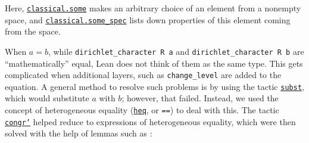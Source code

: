 \documentclass[a4paper,UKenglish,cleveref, autoref, thm-restate,pdfa]{lipics-v2021}
\newcommand{\lean}[1]{\texttt{#1}\xspace} %
\begin{document}
Here, \href{https://leanprover-community.github.io/mathlib_docs/init/classical.html#classical.some}{\lean{classical.some}} 
makes an arbitrary choice of an element from a nonempty space, and \href{https://leanprover-community.github.io/mathlib_docs/init/classical.html#classical.some_spec}{\lean{classical.some\_spec}} 
lists down properties of this element coming from the space. 

When $a = b$, while \lean{dirichlet\_character R a} and \lean{dirichlet\_character R b} are ``mathematically'' equal, Lean does 
not think of them as the same type. This gets complicated when additional layers, such as \lean{change\_level} are added to the equation. 
A general method to resolve such problems is by using the tactic \href{https://leanprover-community.github.io/mathlib_docs/tactics.html#subst}{\lean{subst}}, 
which would substitute $a$ with $b$; however, that failed. Instead, we used the concept of heterogeneous equality (\href{https://leanprover-community.github.io/mathlib_docs/init/core.html#heq}{\lean{heq}}, or \lean{==}) 
to deal with this. The tactic \href{https://leanprover-community.github.io/mathlib_docs/tactics.html#congr'}{\lean{congr'}} helped reduce to expressions of heterogeneous equality, 
which were then solved with the help of lemmas such as :
\end{document}
